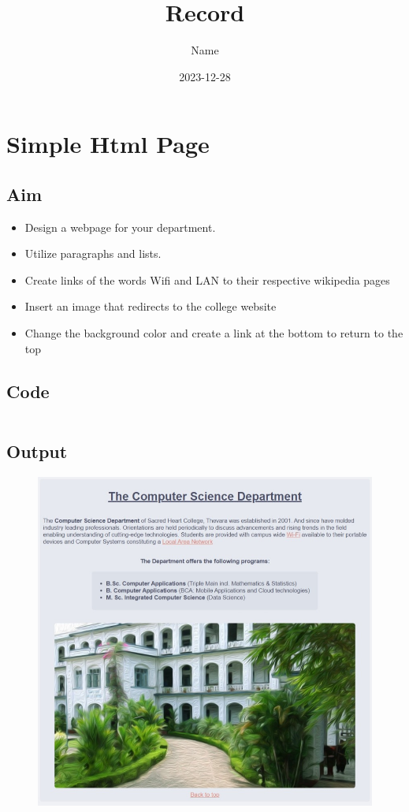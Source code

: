 \documentclass{article}
\title{Record}
\author{Name}
\date{2023-12-28}
\begin{document}

\newpage
\tableofcontents
\newpage

\section{Simple Html Page}
\subsection{Aim}
\begin{itemize}
	\item Design a webpage for your department.
	\item Utilize paragraphs and lists.
	\item Create links of the words Wifi and LAN to their respective wikipedia pages
	\item Insert an image that redirects to the college website
	\item Change the background color and create a link at the bottom to return to the top
\end{itemize}

\subsection{Code}
\inputminted[frame=lines, breaklines, breakanywhere, numberblanklines=false]{html}{./prog_1/index.html}

\newpage
\subsection{Output}
\begin{figure}[h!]
	\centering
	\includegraphics[width=1\textwidth]{./Assets/p0101.jpeg}
\end{figure}
\newpage
\end{document}
